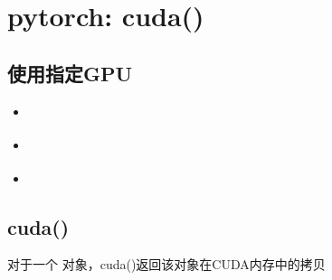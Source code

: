 \documentclass[letterpaper,10pt,english]{sphinxmanual}
\begin{document}
\section{pytorch: cuda()}
\label{\detokenize{deepLearning/06_cuda:pytorch-cuda}}\label{\detokenize{deepLearning/06_cuda::doc}}

\subsection{使用指定GPU}
\label{\detokenize{deepLearning/06_cuda:gpu}}\begin{itemize}
\item {} 

%
\begin{sphinxVerbatim}[commandchars=\\\{\}]
  
\end{sphinxVerbatim}

\item {} 

%
\begin{sphinxVerbatim}[commandchars=\\\{\}]
 
\PYG{p}{[}\PYG{p}{]}  
\end{sphinxVerbatim}

\item {} 

%
\begin{sphinxVerbatim}[commandchars=\\\{\}]
 
\end{sphinxVerbatim}

\end{itemize}


\subsection{cuda()}
\label{\detokenize{deepLearning/06_cuda:cuda}}
对于一个  对象，cuda()返回该对象在CUDA内存中的拷贝
\end{document}

